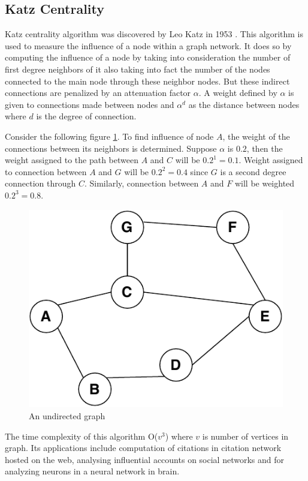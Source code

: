 \documentclass[journal,twoside,web]{ieeecolor}
\begin{document}
\subsection{Katz Centrality}
Katz centrality algorithm was discovered by Leo Katz in 1953 \cite{58}. This algorithm is used to measure the influence of a node within a graph network. It does so by computing the influence of a node by taking into consideration the number of first degree neighbors of it also taking into fact the number of the nodes connected to the main node through these neighbor nodes. But these indirect connections are penalized by an attenuation factor $\alpha$. A weight defined by $\alpha$ is given to connections made between nodes and $\alpha$$^d$  as the distance between nodes where $d$ is the degree of connection.

Consider the following figure \ref{fig12}. To find influence of node $A$, the weight of the connections between its neighbors is determined. Suppose $\alpha$ is $0.2$, then the weight assigned to the path between $A$ and $C$ will be $0.2^1 = 0.1$. Weight assigned to connection between $A$ and $G$ will be $0.2^2 = 0.4$ since $G$ is a second degree connection through $C$. Similarly, connection between $A$ and $F$ will be weighted $0.2^3 = 0.8$.

\begin{figure}[!h]
    \centerline{\includegraphics[scale=0.6]{figures/katz.pdf}}
    \caption{An undirected graph}
    \label{fig12}
\end{figure}

The time complexity of this algorithm O($v^3$) where $v$ is number of vertices in graph. Its applications include computation of citations in citation network hosted on the web, analysing influential accounts on social networks and for analyzing neurons in a neural network in brain.
\end{document}

